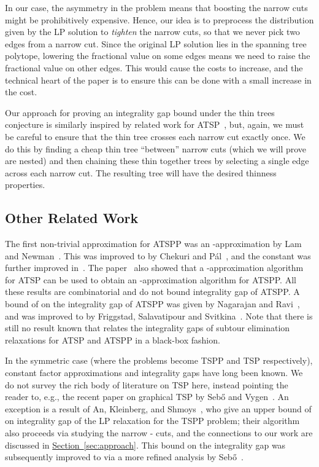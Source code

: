 \documentclass[11pt]{article}
\newcommand{\lref}[2][]{\hyperref[#2]{#1~\ref*{#2}}}
\theoremstyle{definition}
\begin{document}
In our case, the asymmetry in the problem means that boosting the narrow
cuts might be prohibitively expensive. Hence, our idea is to preprocess
the distribution given by the LP solution to \emph{tighten} the narrow
cuts, so that we never pick two edges from a narrow cut. Since the
original LP solution lies in the spanning tree polytope, lowering the
fractional value on some edges means we need to raise the fractional value on other edges. This would cause
the costs to increase, and the technical heart of the paper is to ensure
this can be done with a small increase in the cost.

Our approach for proving an  integrality gap bound
under the thin trees conjecture is similarly inspired by related work
for ATSP~\cite{GS11},
but, again, we must be careful to ensure that the thin tree
crosses each narrow cut exactly once.
We do this by finding a cheap thin tree ``between'' narrow cuts
(which we will prove are nested) and then chaining these thin together
trees by selecting a single edge across each narrow cut.
The resulting tree will have the desired thinness properties.








\subsection{Other Related Work}
\label{sec:related-work}

The first non-trivial approximation for ATSPP was an
-approximation by Lam and Newman~\cite{LN08}. This was
improved to  by Chekuri and P\'al~\cite{CP07}, and the
constant was further improved in~\cite{FS07}. The paper~\cite{FS07} also
showed that a -approximation algorithm for ATSP can be used
to obtain an -approximation algorithm for ATSPP.
All these results are combinatorial and do not bound
integrality gap of ATSPP. A bound of  on the integrality
gap of ATSPP was given by Nagarajan and Ravi~\cite{NR-direct-latency},
and was improved to  by Friggstad, Salavatipour and
Svitkina~\cite{FSS10}. Note that there is still no result known that
relates the integrality gaps of subtour elimination relaxations for ATSP and ATSPP in a
black-box fashion.

In the symmetric case (where the problems become TSPP and TSP
respectively), constant factor approximations and integrality gaps have
long been known. We do not survey the rich body of literature on TSP
here, instead pointing the reader to, e.g., the recent paper on
graphical TSP by Seb\H{o} and Vygen~\cite{SV12}. An exception is a
result of An, Kleinberg, and Shmoys~\cite{AKS12}, who give an upper
bound of  on integrality gap of the LP relaxation for the TSPP
problem; their algorithm also proceeds via studying the narrow -
cuts, and the connections to our work are discussed in
\lref[Section]{sec:approach}.  This bound on the integrality gap was
subsequently improved to  via a more refined analysis by
Seb\H{o}~\cite{Sebo13}.
\end{document}
